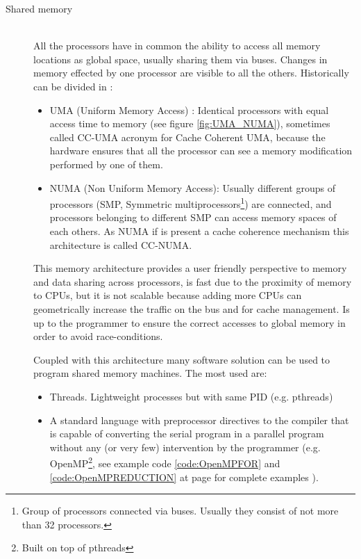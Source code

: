 \begin{description}
\item[Shared memory] \hfill \\ 
All the processors have in common the ability to access
all memory locations as global space, usually sharing them  via buses. Changes
in memory effected by one processor are visible to all the others. Historically
can be divided in :
		\begin{itemize}
  			\item UMA (Uniform Memory Access) : Identical processors with equal
  			access time to memory (see figure \ref{fig:UMA_NUMA}),
  			sometimes called CC-UMA acronym for Cache Coherent UMA, because the
  			hardware ensures that all the processor can see a memory modification
  			performed by one of them.
  			\item NUMA (Non Uniform Memory Access): Usually different groups
  			of processors (SMP, Symmetric multiprocessors\footnote{Group of processors
  			connected via buses. Usually they consist of not more than 32 processors.})
  			are connected, and processors belonging to different SMP can access memory
  			spaces of each others. As NUMA if is present a cache coherence mechanism
  			this architecture is called CC-NUMA.
  			
		\end{itemize}
		This memory architecture provides a user friendly perspective to memory and
		data sharing across processors, is fast due to the proximity of memory to
		CPUs, but it is not scalable because adding more CPUs can
		geometrically increase the traffic on the bus and for cache management. Is up
		to the programmer to ensure the correct accesses to global memory in order to
		avoid race-conditions.
		
		Coupled with this architecture many software solution can be used to program
		shared memory machines. The most used are:

\begin{itemize}
  \item Threads. Lightweight processes but with same PID (e.g. pthreads)
  \item A standard language with preprocessor directives to the compiler that is
  capable of converting the serial program in a parallel program without any (or
  very few) intervention by the programmer (e.g. OpenMP\footnote{Built on top
  of pthreads}, see example code \ref{code:OpenMPFOR} and
  \ref{code:OpenMPREDUCTION} at page \pageref{code:OpenMPFOR} for complete examples ).


\end{itemize}
\end{description}
